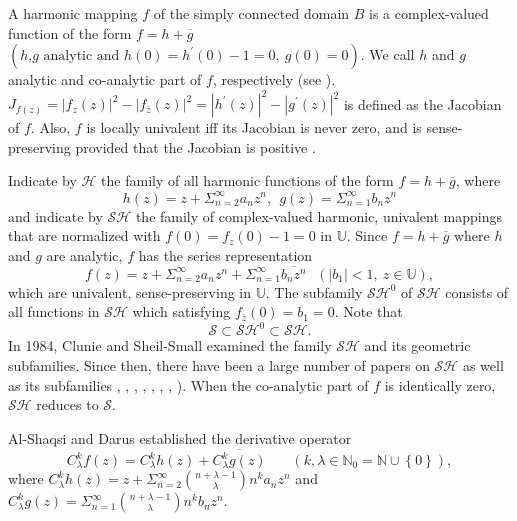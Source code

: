 \documentclass[12pt,reqno]{amsart}
\begin{document}
A harmonic mapping $f$ of the simply connected domain $B$ is a
complex-valued function of the form $f=h+\overline{g}$ $\left( h\text{,}g%
\text{ analytic and }h(0)=h^{\prime }(0)-1=0,\ g(0)=0\right) .$ We call $h$
and $g$ analytic and co-analytic part of $f$, respectively (see \cite{CS-S}%
). $J_{f(z)}=\left\vert f_{z}(z)\right\vert
^{2}-\left\vert f_{\overline{z}}(z)\right\vert ^{2}=\left\vert h^{\prime
}(z)\right\vert ^{2}-\left\vert g^{\prime }(z)\right\vert ^{2}$ is defined as the Jacobian of $f$. Also, $f$ is locally univalent iff its Jacobian is
never zero, and is sense-preserving provided that the Jacobian is positive \cite{L}.

Indicate by $\mathcal{H}$ the family of all harmonic functions of the form $%
f=h+\overline{g}$, where 
\begin{equation}
h(z)=z+ \Sigma_{n=2}^{\infty}a_{n}z^{n},~\
g(z)= \Sigma_{n=1}^{\infty}b_{n}z^{n}  \label{C}
\end{equation}%
and indicate by $\mathcal{SH}$ the family of complex-valued harmonic, univalent
mappings that are normalized with $f(0)=f_{z}(0)-1=0$ in $\mathbb{U}$. Since $f=h+\overline{g}$ where $h$ and $g$ are analytic, $f$ has the series
representation 
\begin{equation}
f(z)=z+\Sigma_{n=2}^{\infty}a_{n}z^{n}+\Sigma_{n=1}^{\infty}
\overline{b_{n}z^{n}}\ \ \ \left( \left\vert b_{1}\right\vert <1,\ z\in 
\mathbb{U}\right) ,  \label{3}
\end{equation}%
which are univalent, sense-preserving in ${\mathbb{U}}.$ The subfamily $\mathcal{SH}^{0}$ of $\mathcal{SH}$ consists of all functions in $\mathcal{SH}$ which satisfying $f_{\bar{z}}(0)=b_{1}=0.$ Note that%
\begin{equation*}
\mathcal{S}\subset \mathcal{SH}^{0}\subset \mathcal{SH}.
\end{equation*}%
In 1984, Clunie and Sheil-Small \cite{CS-S} examined the family $\mathcal{SH}$ and its geometric subfamilies.
Since then, there have been a large number of papers on $\mathcal{SH}$ as well
as its subfamilies \cite{alt}, \cite{ca}, \cite{D}, \cite%
{DD}, \cite{J}, \cite{mos}, \cite{s}, \cite{yasar2}). When the co-analytic part of 
$f$ is identically zero, $\mathcal{SH}$ reduces to $\mathcal{S}$.

Al-Shaqsi and Darus \cite{al} established the derivative operator
\begin{equation*}
C_{\lambda }^{k}f(z)=C_{\lambda }^{k}h(z)+\overline{C_{\lambda }^{k}g(z)}~\
\ \ \ \ \ \ \left( k,\lambda \in \mathbb{N}
_{0}=\mathbb{N}\cup \left\{ 0\right\} \right) ,
\end{equation*}%
where $C_{\lambda }^{k}h(z)=z+\Sigma_{n=2}^{\infty}\binom{n+\lambda -1%
}{\lambda }n^{k}a_{n}z^{n}$ and $C_{\lambda
}^{k}g(z)=\Sigma_{n=1}^{\infty}\binom{n+\lambda -1}{\lambda }%
n^{k}b_{n}z^{n}.$
\end{document}
